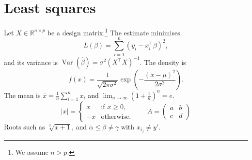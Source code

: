 \documentclass{article}
\begin{document}
\section*{Least squares}
Let $X \in \mathbb{R}^{n \times p}$ be a design matrix.\footnote{We assume $n > p$.} The estimate minimises
\begin{equation}
L(\beta) = \sum_{i=1}^{n} \left( y_i - x_i^\top \beta \right)^2,
\end{equation}
and its variance is $\operatorname{Var}(\hat\beta) = \sigma^2 (X^\top X)^{-1}$.
The density is
\[
f(x) = \frac{1}{\sqrt{2\pi\sigma^2}} \exp\left( -\frac{(x-\mu)^2}{2\sigma^2} \right).
\]
The mean is $\bar{x} = \frac{1}{n} \sum_{i=1}^n x_i$ and $\lim_{n \to \infty} \left(1 + \frac{1}{n}\right)^n = e$.
\[
|x| = \begin{cases} x & \text{if } x \geq 0, \\ -x & \text{otherwise.} \end{cases}
\qquad
A = \begin{pmatrix} a & b \\ c & d \end{pmatrix}
\]
Roots such as $\sqrt[3]{x+1}$, and $\alpha \leq \beta \neq \gamma$ with $x_{i_j} \neq y'$.
\end{document}
